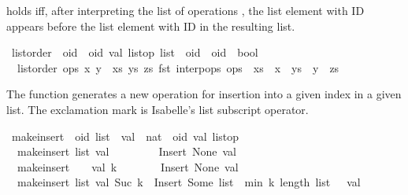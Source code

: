 \noindent {} holds iff, after interpreting the list of operations , the list element with ID  appears before the list element with ID  in the resulting list.

\begin{isabelle}
\isamarkupfalse%
\ list{\isacharunderscore}order\ {\isacharcolon}{\isacharcolon}\ {\isachardoublequoteopen}{\isacharparenleft}{\isacharprime}oid\ {\isasymtimes}\ {\isacharparenleft}{\isacharprime}oid{\isacharcomma}\ {\isacharprime}val{\isacharparenright}\ list{\isacharunderscore}op{\isacharparenright}\ list\ {\isasymRightarrow}\ {\isacharprime}oid\ {\isasymRightarrow}\ {\isacharprime}oid\ {\isasymRightarrow}\ bool{\isachardoublequoteclose}\ \isanewline
\ \ {\isachardoublequoteopen}list{\isacharunderscore}order\ ops\ x\ y\ {\isasymequiv}\ {\isasymexists}xs\ ys\ zs{\isachardot}\ fst\ {\isacharparenleft}interp{\isacharunderscore}ops\ ops{\isacharparenright}\ {\isacharequal}\ xs\ {\isacharat}\ {\isacharbrackleft}x{\isacharbrackright}\ {\isacharat}\ ys\ {\isacharat}\ {\isacharbrackleft}y{\isacharbrackright}\ {\isacharat}\ zs{\isachardoublequoteclose}%
\end{isabelle}

\noindent The  function generates a new operation for insertion into a given index in a given list.
The exclamation mark is Isabelle's list subscript operator.

\begin{isabelle}
\isamarkupfalse%
\ make{\isacharunderscore}insert\ {\isacharcolon}{\isacharcolon}\ {\isachardoublequoteopen}{\isacharprime}oid\ list\ {\isasymRightarrow}\ {\isacharprime}val\ {\isasymRightarrow}\ nat\ {\isasymRightarrow}\ {\isacharparenleft}{\isacharprime}oid{\isacharcomma}\ {\isacharprime}val{\isacharparenright}\ list{\isacharunderscore}op{\isachardoublequoteclose}\ \isanewline
\ \ {\isachardoublequoteopen}make{\isacharunderscore}insert\ list\ val\ {}\ \ \ \ \ \ \ {\isacharequal}\ Insert\ None\ val{\isachardoublequoteclose}\ {\isacharbar}\isanewline
\ \ {\isachardoublequoteopen}make{\isacharunderscore}insert\ {\isacharbrackleft}{\isacharbrackright}\ \ \ val\ k\ \ \ \ \ \ \ {\isacharequal}\ Insert\ None\ val{\isachardoublequoteclose}\ {\isacharbar}\isanewline
\ \ {\isachardoublequoteopen}make{\isacharunderscore}insert\ list\ val\ {\isacharparenleft}Suc\ k{\isacharparenright}\ {\isacharequal}\ Insert\ {\isacharparenleft}Some\ {\isacharparenleft}list\ {\isacharbang}\ {\isacharparenleft}min\ k\ {\isacharparenleft}length\ list\ {\isacharminus}\ {}{\isacharparenright}{\isacharparenright}{\isacharparenright}{\isacharparenright}\ val{\isachardoublequoteclose}%
\end{isabelle}

